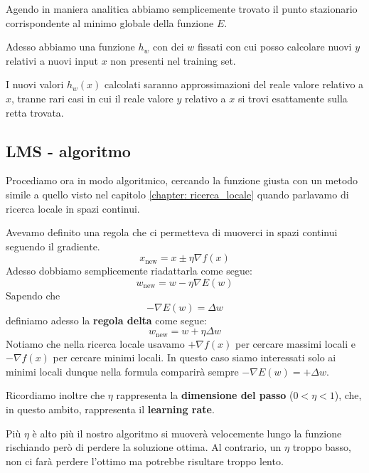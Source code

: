 Agendo in maniera analitica abbiamo semplicemente trovato il punto stazionario corrispondente al minimo globale della
funzione $E$.

Adesso abbiamo una funzione $h_w$ con dei $w$ fissati con cui posso calcolare nuovi $y$ relativi a nuovi
input $x$ non presenti nel training set.

I nuovi valori $h_w(x)$ calcolati saranno approssimazioni del reale valore relativo a $x$, tranne rari casi
in cui il reale valore $y$ relativo a $x$ si trovi esattamente sulla retta trovata.

\subsection{LMS - algoritmo}
Procediamo ora in modo algoritmico, cercando la funzione giusta con un metodo simile a quello visto nel capitolo
\ref{chapter: ricerca_locale} quando parlavamo di ricerca locale in spazi continui.

Avevamo definito una regola che ci permetteva di muoverci in spazi continui seguendo il gradiente.
\[ x_{\text{new}} = x \pm \eta \nabla f(x) \]
Adesso dobbiamo semplicemente riadattarla come segue:
\[ w_{\text{new}} = w - \eta \nabla E(w) \]
Sapendo che
\[ -\nabla E(w) = \Delta w \]
definiamo adesso la \textbf{regola delta} come segue:
\[ w_{\text{new}} = w + \eta \Delta w \]
Notiamo che nella ricerca locale usavamo $+\nabla f(x)$ per cercare massimi locali e $-\nabla f(x)$ per cercare minimi
locali. In questo caso siamo interessati solo ai minimi locali dunque nella formula comparir\`a sempre
$-\nabla E(w) = +\Delta w$.

Ricordiamo inoltre che $\eta$ rappresenta la \textbf{dimensione del passo} ($0 < \eta < 1$), che, in questo ambito,
rappresenta il \textbf{learning rate}.

Pi\`u $\eta$ \`e alto pi\`u il nostro algoritmo si muover\`a velocemente lungo la funzione rischiando per\`o di perdere
la soluzione ottima. Al contrario, un $\eta$ troppo basso, non ci far\`a perdere l'ottimo ma potrebbe risultare troppo
lento.


